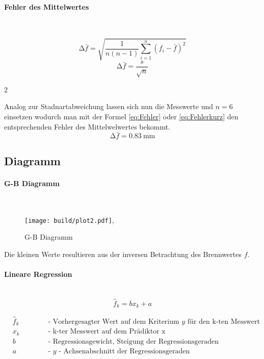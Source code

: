 \paragraph{Fehler des Mittelwertes} \mbox{} \\
\begin{multicols}{2}
    \begin{equation}
    \label{eq:Fehler}
    \increment \bar{f} = \sqrt{\frac{1}{n(n-1)} \sum_{i=1}^n (f_i - \bar{f})^2}
    \end{equation}\break
    \begin{equation}
    \label{eq:Fehlerkurz}
    \increment \bar{f} =\frac{s}{\sqrt{n}}
    \end{equation}
\end{multicols}{2}

Analog zur Stadnartabweichung lassen sich nun die Messwerte und $n=6$ einsetzen wodurch man mit der Formel \eqref{eq:Fehler} oder \eqref{eq:Fehlerkurz}
 den entsprechenden Fehler des Mittelwelwertes bekommt.
\begin{equation}
\increment \bar{f}= \SI{0.83}{\milli\meter}
\end{equation}
\newpage

\subsection{Diagramm}
\paragraph{G-B Diagramm} \mbox{} \\

\begin{figure}
    \centering
    \texttt{[image: build/plot2.pdf]},
   \caption{G-B Diagramm}
   \label{fig:G-B}
\end{figure}

Die kleinen Werte resultieren aus der inversen Betrachtung des Brennwertes $f$.

\paragraph{Lineare Regression} \mbox{}\\

\begin{equation}
\label{eq:LR}
\hat{f}_k = bx_k +a 
\end{equation}

\begin{align*}
&\hat{f}_k   &&\text{- Vorhergesagter Wert auf dem Kriterium $y$ für den k-ten Messwert} \\
&x_k  \hspace{1cm} &&\text{- k-ter Messwert auf dem Prädiktor x}  \\
&b  &&\text{- Regressionsgewicht, Steigung der Regressionsgeraden } \\
&a &&\text{- $y$ - Achsenabschnitt der Regressionsgeraden} 
\end{align*}


